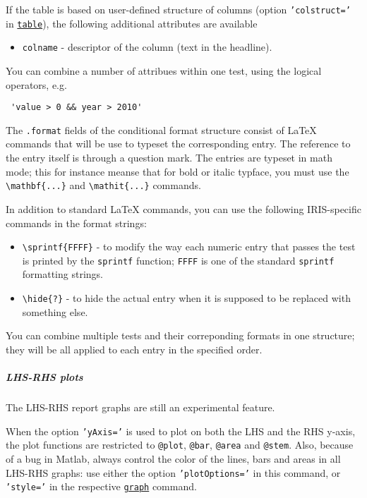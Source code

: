  If the table is based on user-defined structure of columns (option
 \texttt{'colstruct='} in \href{report/table}{\texttt{table}}), the
 following additional attributes are available
 
 \begin{itemize}
 \item
   \texttt{colname} - descriptor of the column (text in the headline).
 \end{itemize}
 
 You can combine a number of attribues within one test, using the logical
 operators, e.g.
 
 \begin{verbatim}
 'value > 0 && year > 2010'
 \end{verbatim}
 
 The \texttt{.format} fields of the conditional format structure consist
 of LaTeX commands that will be use to typeset the corresponding entry.
 The reference to the entry itself is through a question mark. The
 entries are typeset in math mode; this for instance meanse that for bold
 or italic typface, you must use the
 \texttt{\textbackslash{}mathbf\{...\}} and
 \texttt{\textbackslash{}mathit\{...\}} commands.
 
 In addition to standard LaTeX commands, you can use the following
 IRIS-specific commands in the format strings:
 
 \begin{itemize}
 \item
   \texttt{\textbackslash{}sprintf\{FFFF\}} - to modify the way each
   numeric entry that passes the test is printed by the \texttt{sprintf}
   function; \texttt{FFFF} is one of the standard \texttt{sprintf}
   formatting strings.
 \item
   \texttt{\textbackslash{}hide\{?\}} - to hide the actual entry when it
   is supposed to be replaced with something else.
 \end{itemize}
 
 You can combine multiple tests and their correponding formats in one
 structure; they will be all applied to each entry in the specified
 order.
 
 \subparagraph{LHS-RHS plots}
 
 The LHS-RHS report graphs are still an experimental feature.
 
 When the option \texttt{'yAxis='} is used to plot on both the LHS and
 the RHS y-axis, the plot functions are restricted to \texttt{@plot},
 \texttt{@bar}, \texttt{@area} and \texttt{@stem}. Also, because of a bug
 in Matlab, always control the color of the lines, bars and areas in all
 LHS-RHS graphs: use either the option \texttt{'plotOptions='} in this
 command, or \texttt{'style='} in the respective
 \href{report/graph}{\texttt{graph}} command.
 
